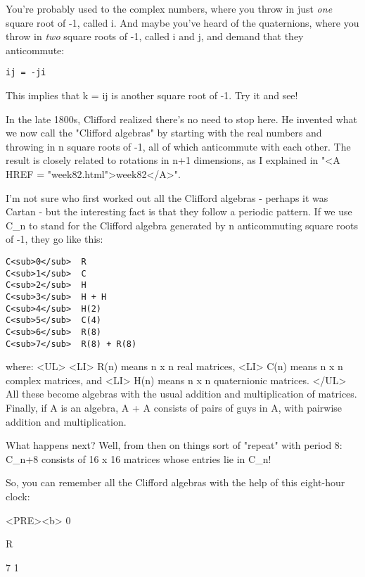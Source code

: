 You're probably used to the complex numbers, where you throw in just 
\emph{one}
square root of -1, called i.  And maybe you've heard of the quaternions, where 
you throw in \emph{two} 
square roots of -1, called i and j, and demand that they
anticommute:

\begin{verbatim}
ij = -ji
\end{verbatim}
    
This implies that k = ij is another square root of -1.   Try it and see!

In the late 1800s, Clifford realized there's no need to stop here.  He invented 
what we now call the "Clifford algebras" by starting with the real numbers and 
throwing in n square roots of -1, all of which anticommute with each other.
The result is closely related to rotations in n+1 dimensions, as I explained in 
"<A HREF = "week82.html">week82</A>".
  
I'm not sure who first worked out all the Clifford algebras - perhaps it was
Cartan - but the interesting fact is that they follow a periodic pattern. 
If we use C_{n} to stand for the Clifford algebra generated by n anticommuting
square roots of -1, they go like this:

\begin{verbatim}
C<sub>0</sub>  R
C<sub>1</sub>  C
C<sub>2</sub>  H
C<sub>3</sub>  H + H
C<sub>4</sub>  H(2) 
C<sub>5</sub>  C(4)
C<sub>6</sub>  R(8)
C<sub>7</sub>  R(8) + R(8)
\end{verbatim}
    
where:
<UL>
<LI>
 R(n) means n x n real matrices, 
<LI>
 C(n) means n x n complex matrices, and
<LI>
 H(n) means n x n quaternionic matrices.  
</UL>
All these become algebras with the usual addition and multiplication of 
matrices.  Finally, if A is an algebra, A + A consists of pairs of guys 
in A, with pairwise addition and multiplication.

What happens next?  Well, from then on things sort of "repeat" with period 8: 
C_{n+8} 
consists of 16 x 16 matrices whose entries lie in C_{n}!  

So, you can remember all the Clifford algebras with the help of this 
eight-hour clock:


<PRE><b>
                                    0
                                 
                                    R

                 7                                    1
                                                   
